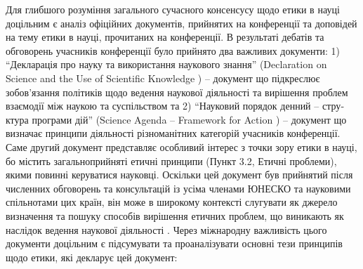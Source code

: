 Для глибшого розуміння загального сучасного консенсусу щодо етики в науці доцільним є аналіз офіційних документів, прийнятих на конференції та доповідей на тему етики в науці, прочитаних на конференції. В результаті дебатів та обговорень учасників конференції було прийнято два важливих документи: 1) \foreignquote{ukrainian}{Декларація про науку та використання наукового знання} (Declaration on Science and the Use of Scientific Knowledge \cite[462]{WorldConferenceOnScience}) -- документ що підкреслює зобов'язання політиків щодо ведення наукової діяльності та вирішення проблем взаємодії між наукою та суспільством та 2) \foreignquote{ukrainian}{Науковий порядок денний – структура програми дій} (Science Agenda – Framework for Action \cite[476]{WorldConferenceOnScience}) -- документ що визначає принципи діяльності різноманітних категорій учасників конференції. Саме другий документ представляє особливий інтерес з точки зору етики в науці, бо містить загальноприйняті етичні принципи (Пункт 3.2, Етичні проблеми)\cite[481]{WorldConferenceOnScience}, якими повинні керуватися науковці. Оскільки цей документ був прийнятий після численних обговорень та консультацій із усіма членами ЮНЕСКО та науковими спільнотами цих країн, він може в широкому контексті слугувати як джерело визначення та пошуку способів вирішення етичних проблем, що виникають як наслідок ведення наукової діяльності \cite{Iaccarino2001-ju}. Через міжнародну важливість цього документи доцільним є підсумувати та проаналізувати основні тези принципів щодо етики, які декларує цей документ:

